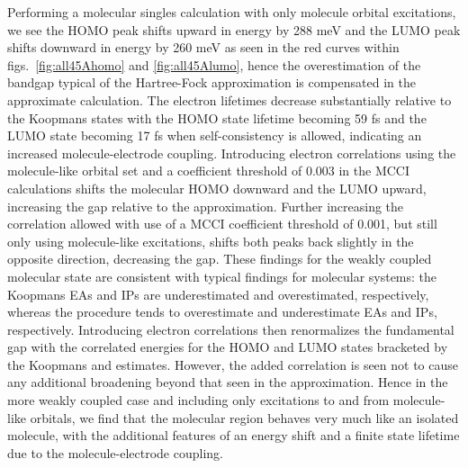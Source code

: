 Performing a molecular singles calculation with only molecule orbital
excitations, we see the HOMO peak shifts upward in energy by 288 meV and
the LUMO peak shifts downward in energy by 260 meV as seen in the red
curves within figs.~\ref{fig:all45Ahomo} and \ref{fig:all45Alumo}, hence
the overestimation of the bandgap typical of the Hartree-Fock approximation
is compensated in the approximate \dscf calculation.
The electron lifetimes decrease substantially relative to the Koopmans
states with the HOMO state lifetime becoming 59 fs and the LUMO state
becoming 17 fs when self-consistency is allowed, indicating an increased
molecule-electrode coupling. 
Introducing electron correlations using the molecule-like orbital
set and a coefficient threshold of 0.003 in the MCCI calculations shifts
the molecular HOMO downward and the LUMO upward, increasing the gap
relative to the \dscf approximation. Further increasing
the correlation allowed with use of a MCCI coefficient threshold of 0.001,
but still only using molecule-like excitations, shifts both peaks back
slightly in the opposite direction, decreasing the gap.
These findings for the weakly coupled molecular state are consistent with
typical findings for molecular systems: the Koopmans EAs and IPs are 
underestimated and overestimated, respectively, whereas the \dscf
procedure tends to overestimate and underestimate EAs and IPs, respectively.
Introducing electron correlations then renormalizes the fundamental gap
with the correlated energies for the HOMO and LUMO states bracketed by
the Koopmans and \dscf estimates.
However, the added correlation is seen not to cause any additional broadening
beyond that seen in the \dscf approximation.
Hence in the more weakly coupled case and including only excitations to and
from molecule-like orbitals, we find that the molecular region behaves
very much like an isolated molecule, with the additional features of an
energy shift and a finite state lifetime due to the molecule-electrode
coupling.

